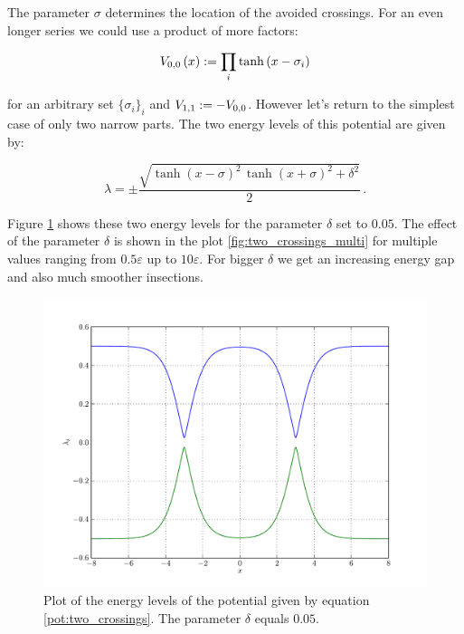 The parameter $\sigma$ determines the location of the avoided crossings. For an
even longer series we could use a product of more factors:

\begin{equation}
  V_{0,0}\left( x \right) := \prod_i \tanh\left( x-\sigma_i \right)
\end{equation}

for an arbitrary set $\{\sigma_i\}_i$ and $V_{1,1} := -V_{0,0}$. However
let's return to the simplest case of only two narrow parts. The two energy levels
of this potential are given by:

\begin{equation}
  \lambda = \pm \frac{\sqrt{{\tanh\left( x-\sigma\right) }^{2}\,{\tanh\left( x+\sigma\right) }^{2}+{\delta}^{2}}}{2} \,.
\end{equation}

Figure \ref{fig:two_crossings} shows these two energy levels for the parameter $\delta$
set to $0.05$. The effect of the parameter $\delta$ is shown in the plot \ref{fig:two_crossings_multi}
for multiple values ranging from $0.5 \varepsilon$ up to $10 \varepsilon$. For
bigger $\delta$ we get an increasing energy gap and also much smoother insections.

\begin{figure}
  \centering
  \includegraphics[width=0.8\linewidth]{./plot/two_crossings/potential_eigenvalues.pdf}
  \caption{Plot of the energy levels of the potential given by equation \eqref{pot:two_crossings}. The parameter $\delta$ equals $0.05$.}
  \label{fig:two_crossings}
\end{figure}

